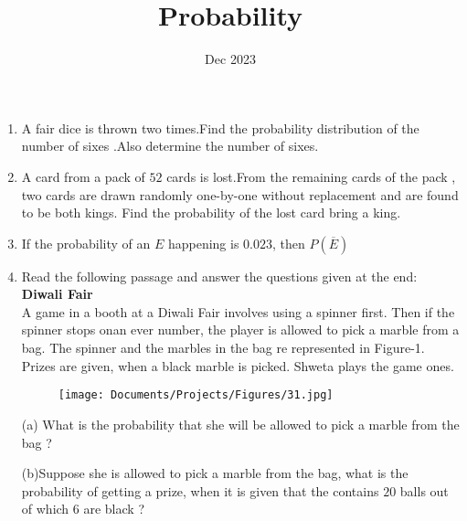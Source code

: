 \documentclass[12pt,-letter paper]{article}
\title{Probability}
\date{Dec 2023}
\begin{document}
\maketitle
\begin{enumerate}

\item A fair dice is thrown two times.Find the probability distribution of the number of sixes .Also determine the number of sixes.

\item A card from a pack of $52$ cards is lost.From the remaining cards of the pack , two cards are drawn randomly one-by-one without replacement and are found to be both kings. Find the probability of the lost card bring a king.

\item If the probability of an $E$ happening is $0.023$, then $P(\overline{E})$

\item Read the following passage and answer the questions given at the end:\\
\textbf{Diwali Fair}\\
A game in a booth at a Diwali Fair involves using a spinner first. Then if the spinner stops onan ever number, the player is allowed to pick a marble from a bag. The spinner and the marbles in the bag re represented in Figure-1.
Prizes are given, when a black marble is picked. Shweta plays the game ones.

		\begin{figure}[H]
			\centering
			\texttt{[image: Documents/Projects/Figures/31.jpg]}
			\caption{}
		\end{figure}

(a) What is the probability that she will be allowed to pick a marble from the bag ?

(b)Suppose she is allowed to pick a marble from the bag, what is the probability of getting a prize, when it is given that the contains $20$ balls out of which $6$ are black ?
\end{enumerate}
\end{document}
